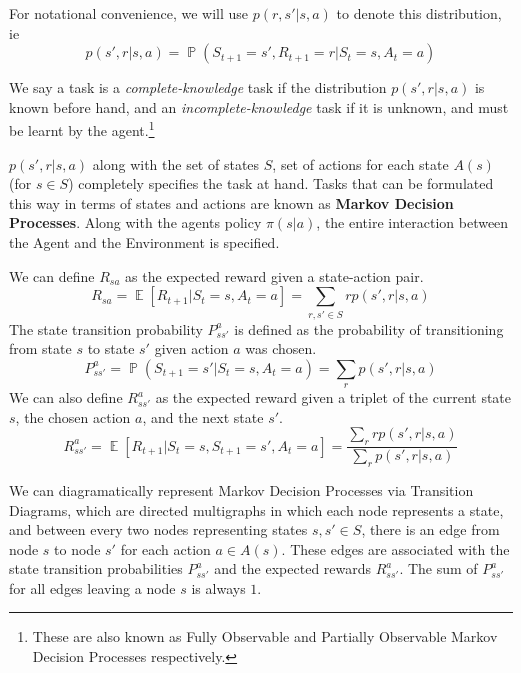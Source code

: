 \documentclass[12pt]{report}
\begin{document}
For notational convenience, we will use $p(r, s' | s, a)$ to denote this distribution, ie 
\begin{equation}
    p(s', r | s, a) = \mathop{\mathbb{P}}(S_{t + 1} = s', R_{t + 1} = r | S_{t} = s, A_{t} = a)
\end{equation}

We say a task is a \textit{complete-knowledge} task if the distribution $p(s', r | s, a)$ is known before hand, and an \textit{incomplete-knowledge} task if it is unknown, and must be learnt by the agent.\footnote{These are also known as Fully Observable and Partially Observable Markov Decision Processes respectively.}

$p(s', r | s, a)$ along with the set of states $S$, set of actions for each state $A(s)$ (for $s \in S$) completely specifies the task at hand. Tasks that can be formulated this way in terms of 
states and actions are known as \textbf{Markov Decision Processes}. Along with the agents policy $\pi(s | a)$, the entire interaction between the Agent and the Environment is specified.

We can define $R_{sa}$ as the expected reward given a state-action pair.
\begin{equation}
    R_{sa} = \mathop{\mathbb{E}}\left[R_{t + 1} | S_{t} = s, A_{t} = a\right] = \sum\limits_{r, s' \in S} r p(s', r | s, a)
\end{equation}
The state transition probability $P_{ss'}^{a}$ is defined as the probability of transitioning from state $s$ to state $s'$ given action $a$ was chosen.
\begin{equation}
    P_{ss'}^{a} = \mathop{\mathbb{P}}(S_{t + 1} = s' | S_{t} = s, A_{t} = a) = \sum\limits_{r} p(s', r | s, a)
\end{equation}
We can also define $R_{ss'}^{a}$ as the expected reward given a triplet of the current state $s$, the chosen action $a$, and the next state $s'$.
\begin{equation}
    R_{ss'}^{a} = \mathop{\mathbb{E}}\left[R_{t + 1} | S_{t} = s, S_{t + 1} = s', A_{t} = a\right] = \frac{\sum\limits_{r} r p(s', r | s, a)}{\sum\limits_{r} p(s', r | s, a)}
\end{equation}

We can diagramatically represent Markov Decision Processes via Transition Diagrams, which are directed multigraphs in which each node represents a state, and between every two nodes representing states 
$s, s' \in S$, there is an edge from node $s$ to node $s'$ for each action $a \in A(s)$. These edges are associated with the state transition probabilities $P_{ss'}^{a}$ and the expected rewards $R_{ss'}^{a}$.
The sum of $P_{ss'}^{a}$ for all edges leaving a node $s$ is always $1$.
\end{document}
